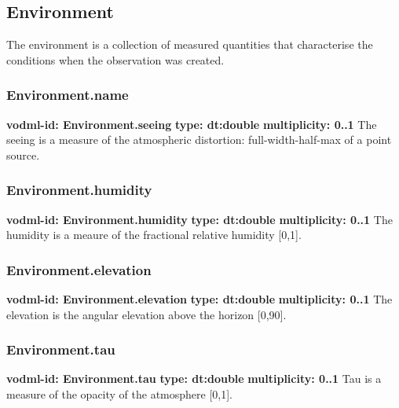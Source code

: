   \subsection{Environment}
  \label{sect:Environment}
    The environment is a collection of measured quantities that characterise the conditions when the observation was created.

    \subsubsection{Environment.name}
      \textbf{vodml-id: Environment.seeing} \newline
      \textbf{type: dt:double} \newline
      \textbf{multiplicity: 0..1} \newline
      The seeing is a measure of the atmospheric distortion: full-width-half-max of a point source.

    \subsubsection{Environment.humidity}
      \textbf{vodml-id: Environment.humidity} \newline
      \textbf{type: dt:double} \newline
      \textbf{multiplicity: 0..1} \newline
      The humidity is a meaure of the fractional relative humidity [0,1].

    \subsubsection{Environment.elevation}
      \textbf{vodml-id: Environment.elevation} \newline
      \textbf{type: dt:double} \newline
      \textbf{multiplicity: 0..1} \newline
      The elevation is the angular elevation above the horizon [0,90].

    \subsubsection{Environment.tau}
      \textbf{vodml-id: Environment.tau} \newline
      \textbf{type: dt:double} \newline
      \textbf{multiplicity: 0..1} \newline
      Tau is a measure of the opacity of the atmosphere [0,1].

